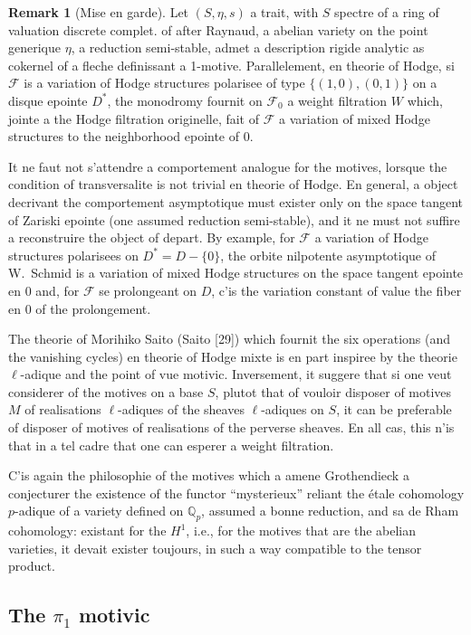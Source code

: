 \documentclass[11pt,a4paper]{article}
\theoremstyle{plain}
\theoremstyle{definition}
\newtheorem{remark}[theorem]{Remark}
\newcommand{\Q}{\mathbb{Q}}
\begin{document}
\begin{remark}[Mise en garde]
Let $(S, \eta, s)$ a trait, with $S$ spectre of a ring of valuation discrete complet. of after Raynaud, a abelian variety on the point generique $\eta$, a reduction semi-stable, admet a description rigide analytic as cokernel of a fleche definissant a 1-motive. Parallelement, en theorie of Hodge, si $\mathscr{F}$ is a variation of Hodge structures polarisee of type $\{(1,0), (0,1)\}$ on a disque epointe $D^*$, the monodromy fournit on $\mathscr{F}_0$ a weight filtration $W$ which, jointe a the Hodge filtration originelle, fait of $\mathscr{F}$ a variation of mixed Hodge structures to the neighborhood epointe of $0$.

It ne faut not s'attendre a comportement analogue for the motives, lorsque the condition of transversalite is not trivial en theorie of Hodge. En general, a object decrivant the comportement asymptotique must exister only on the space tangent of Zariski epointe (one assumed reduction semi-stable), and it ne must not suffire a reconstruire the object of depart. By example, for $\mathscr{F}$ a variation of Hodge structures polarisees on $D^* = D - \{0\}$, the orbite nilpotente asymptotique of W.~Schmid is a variation of mixed Hodge structures on the space tangent epointe en $0$ and, for $\mathscr{F}$ se prolongeant on $D$, c'is the variation constant of value the fiber en $0$ of the prolongement.

The theorie of Morihiko Saito (Saito [29]) which fournit the six operations (and the vanishing cycles) en theorie of Hodge mixte is en part inspiree by the theorie $\ell$-adique and the point of vue motivic. Inversement, it suggere that si one veut considerer of the motives on a base $S$, plutot that of vouloir disposer of motives $M$ of realisations $\ell$-adiques of the sheaves $\ell$-adiques on $S$, it can be preferable of disposer of motives of realisations of the perverse sheaves. En all cas, this n'is that in a tel cadre that one can esperer a weight filtration.
\end{remark}

C'is again the philosophie of the motives which a amene Grothendieck a conjecturer the existence of the functor ``mysterieux'' reliant the étale cohomology $p$-adique of a variety defined on $\Q_p$, assumed a bonne reduction, and sa de Rham cohomology: existant for the $H^1$, i.e., for the motives that are the abelian varieties, it devait exister toujours, in such a way compatible to the tensor product.

\subsection{The $\pi_1$ motivic}
\end{document}

